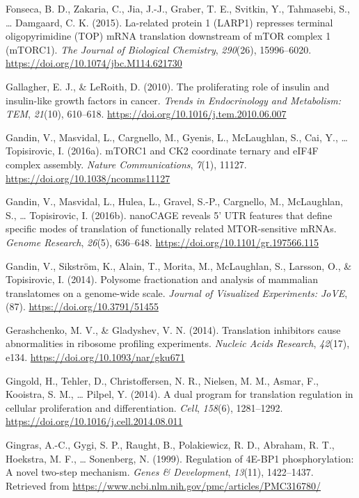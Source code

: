 \documentclass[12pt,openany]{book}
\begin{document}
\hypertarget{ref-Fonseca2015}{}
Fonseca, B. D., Zakaria, C., Jia, J.-J., Graber, T. E., Svitkin, Y.,
Tahmasebi, S., \ldots{} Damgaard, C. K. (2015). La-related protein 1
(LARP1) represses terminal oligopyrimidine (TOP) mRNA translation
downstream of mTOR complex 1 (mTORC1). \emph{The Journal of Biological
Chemistry}, \emph{290}(26), 15996--6020.
\url{https://doi.org/10.1074/jbc.M114.621730}

\hypertarget{ref-Gallagher2010}{}
Gallagher, E. J., \& LeRoith, D. (2010). The proliferating role of
insulin and insulin-like growth factors in cancer. \emph{Trends in
Endocrinology and Metabolism: TEM}, \emph{21}(10), 610--618.
\url{https://doi.org/10.1016/j.tem.2010.06.007}

\hypertarget{ref-Gandin2016}{}
Gandin, V., Masvidal, L., Cargnello, M., Gyenis, L., McLaughlan, S.,
Cai, Y., \ldots{} Topisirovic, I. (2016a). mTORC1 and CK2 coordinate
ternary and eIF4F complex assembly. \emph{Nature Communications},
\emph{7}(1), 11127. \url{https://doi.org/10.1038/ncomms11127}

\hypertarget{ref-Gandin2016a}{}
Gandin, V., Masvidal, L., Hulea, L., Gravel, S.-P., Cargnello, M.,
McLaughlan, S., \ldots{} Topisirovic, I. (2016b). nanoCAGE reveals 5'
UTR features that define specific modes of translation of functionally
related MTOR-sensitive mRNAs. \emph{Genome Research}, \emph{26}(5),
636--648. \url{https://doi.org/10.1101/gr.197566.115}

\hypertarget{ref-Gandin2014}{}
Gandin, V., Sikström, K., Alain, T., Morita, M., McLaughlan, S.,
Larsson, O., \& Topisirovic, I. (2014). Polysome fractionation and
analysis of mammalian translatomes on a genome-wide scale. \emph{Journal
of Visualized Experiments: JoVE}, (87).
\url{https://doi.org/10.3791/51455}

\hypertarget{ref-Gerashchenko2014}{}
Gerashchenko, M. V., \& Gladyshev, V. N. (2014). Translation inhibitors
cause abnormalities in ribosome profiling experiments. \emph{Nucleic
Acids Research}, \emph{42}(17), e134.
\url{https://doi.org/10.1093/nar/gku671}

\hypertarget{ref-Gingold2014}{}
Gingold, H., Tehler, D., Christoffersen, N. R., Nielsen, M. M., Asmar,
F., Kooistra, S. M., \ldots{} Pilpel, Y. (2014). A dual program for
translation regulation in cellular proliferation and differentiation.
\emph{Cell}, \emph{158}(6), 1281--1292.
\url{https://doi.org/10.1016/j.cell.2014.08.011}

\hypertarget{ref-Gingras1999}{}
Gingras, A.-C., Gygi, S. P., Raught, B., Polakiewicz, R. D., Abraham, R.
T., Hoekstra, M. F., \ldots{} Sonenberg, N. (1999). Regulation of 4E-BP1
phosphorylation: A novel two-step mechanism. \emph{Genes \&
Development}, \emph{13}(11), 1422--1437. Retrieved from
\url{https://www.ncbi.nlm.nih.gov/pmc/articles/PMC316780/}
\end{document}
